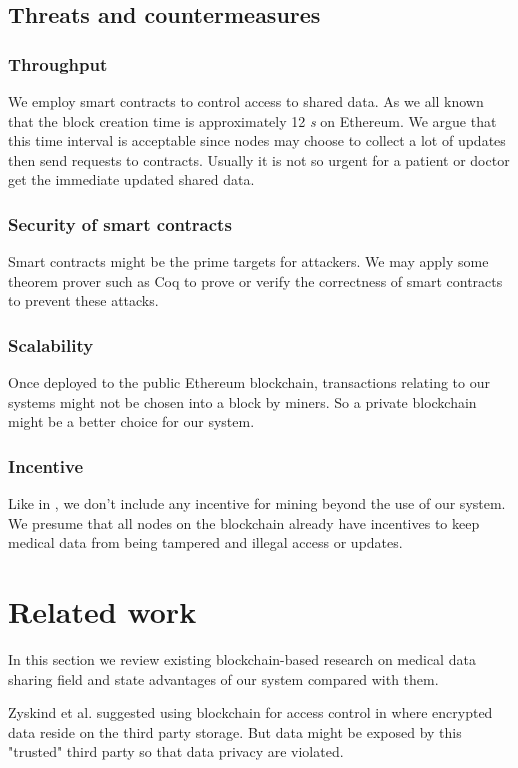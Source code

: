 \documentclass[conference]{IEEEtran}
\begin{document}
\subsection{Threats and countermeasures}
\subsubsection{Throughput}
We employ smart contracts to control access to shared data. As we all known that the block creation time is approximately 12 \textit{s} on Ethereum. We argue that this time interval is acceptable since nodes may choose to collect a lot of updates then send requests to contracts. Usually it is not so urgent for a patient or doctor get the immediate updated shared data.

\subsubsection{Security of smart contracts }
Smart contracts might be the prime targets for attackers. We may apply some theorem prover such as Coq\cite{huet2004coq} to prove or verify the correctness of smart contracts to prevent these attacks.

\subsubsection{Scalability}
Once deployed to the public Ethereum blockchain, transactions relating to our systems might not be chosen into a block by miners. So a private blockchain might be a better choice for our system.

\subsubsection{Incentive}
Like in \cite{dagher2018ancile}, we don't include any incentive for mining beyond the use of our system. We presume that all nodes on the blockchain already have incentives to keep medical data from being tampered and illegal access or updates.

\section{Related work}
\label{related work}
In this section we review existing blockchain-based research on medical data sharing field and state advantages of our system compared with them.

Zyskind et al. suggested using blockchain for access control in \cite{zyskind2015decentralizing} where encrypted data reside on the third party storage. But data might be exposed by this "trusted" third party so that data privacy are violated.
\end{document}
